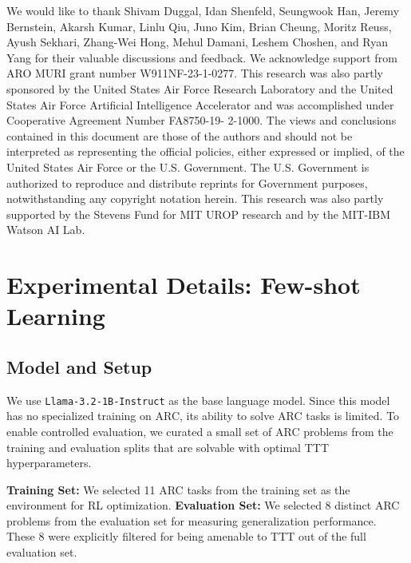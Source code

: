 \documentclass{article}
\begin{document}
\begin{ack}
We would like to thank Shivam Duggal, Idan Shenfeld, Seungwook Han, Jeremy Bernstein, Akarsh Kumar, Linlu Qiu, Juno Kim, Brian Cheung, Moritz Reuss, Ayush Sekhari, Zhang-Wei Hong, Mehul Damani, Leshem Choshen, and Ryan Yang for their valuable discussions and feedback. We acknowledge support from ARO MURI grant number W911NF-23-1-0277. This research was also partly sponsored by the United States Air Force Research Laboratory and the United States Air Force Artificial Intelligence Accelerator and was accomplished under Cooperative Agreement Number FA8750-19- 2-1000. The views and conclusions contained in this document are those of the authors and should not be interpreted as representing the official policies, either expressed or implied, of the United States Air Force or the U.S. Government. The U.S. Government is authorized to reproduce and distribute reprints for Government purposes, notwithstanding any copyright notation herein. This research was also partly supported by the Stevens Fund for MIT UROP research and by the MIT-IBM Watson AI Lab.
\end{ack}





\appendix
\newpage
\section{Experimental Details: Few-shot Learning}
\label{app:exp_details_few_shot}

\subsection{Model and Setup}

We use \texttt{Llama-3.2-1B-Instruct} \citep{grattafiori2024llama3herdmodels} as the base language model. Since this model has no specialized training on ARC, its ability to solve ARC tasks is limited. To enable controlled evaluation, we curated a small set of ARC problems from the training and evaluation splits that are solvable with optimal TTT hyperparameters.

\textbf{Training Set:} We selected 11 ARC tasks from the training set as the environment for RL optimization. 
\textbf{Evaluation Set:} We selected 8 distinct ARC problems from the evaluation set for measuring generalization performance. These 8 were explicitly filtered for being amenable to TTT out of the full evaluation set.
\end{document}
